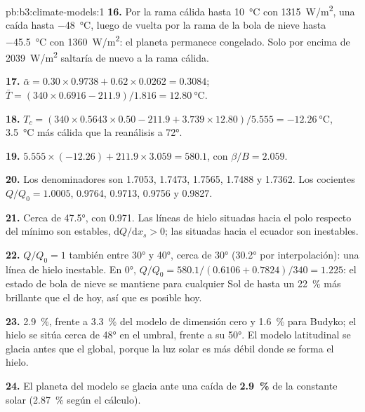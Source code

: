 \begin{solution}{pb:b3:climate-models:1}
\textbf{16.} Por la rama cálida hasta \qty{10}{\celsius} con
\qty{1315}{W/m^2}, una caída hasta \qty{-48}{\celsius}, luego de vuelta por la
rama de la bola de nieve hasta \qty{-45.5}{\celsius} con \qty{1360}{W/m^2}: el planeta
permanece congelado. Solo por encima de \qty{2039}{W/m^2} saltaría de nuevo a la
rama cálida.

\textbf{17.} $\bar\alpha = 0.30\times0.9738 + 0.62\times0.0262 =
\num{0.3084}$; $\bar T = (340\times0.6916 - 211.9)/1.816 =
\qty{12.80}{\celsius}$.

\textbf{18.} $T_c = (340\times0.5643\times0.50 - 211.9 + 3.739\times12.80)/
5.555 = \qty{-12.26}{\celsius}$, \qty{3.5}{\celsius} más cálida que la
reanálisis a \ang{72}.

\textbf{19.} $5.555\times(-12.26) + 211.9\times3.059 = \num{580.1}$, con
$\beta/B = \num{2.059}$.

\textbf{20.} Los denominadores son 1.7053, 1.7473, 1.7565, 1.7488 y
1.7362. Los cocientes $Q/Q_0 = \num{1.0005}$, \num{0.9764}, \num{0.9713},
\num{0.9756} y \num{0.9827}.

\textbf{21.} Cerca de \ang{47.5}, con \num{0.971}. Las líneas de hielo situadas hacia el polo respecto del
mínimo son estables, $\mathrm dQ/\mathrm dx_s > 0$; las situadas hacia el ecuador son
inestables.

\textbf{22.} $Q/Q_0 = 1$ también entre \ang{30} y \ang{40}, cerca de
\ang{30} (\ang{30.2} por interpolación): una línea de hielo inestable. En \ang{0},
$Q/Q_0 = 580.1/(0.6106 + 0.7824)/340 = \num{1.225}$: el estado de bola de nieve se mantiene
para cualquier Sol de hasta un \qty{22}{\percent} más brillante que el de hoy, así que es
posible hoy.

\textbf{23.} \qty{2.9}{\percent}, frente a \qty{3.3}{\percent} del
modelo de dimensión cero y \qty{1.6}{\percent} para Budyko; el hielo se sitúa
cerca de \ang{48} en el umbral, frente a su \ang{50}. El modelo latitudinal
se glacia antes que el global, porque la luz solar es más débil donde
se forma el hielo.

\textbf{24.} El planeta del modelo se glacia ante una caída de
\textbf{\qty[text-series-to-math=true]{2.9}{\percent}} de la
constante solar (\qty{2.87}{\percent} según el cálculo).
\end{solution}
